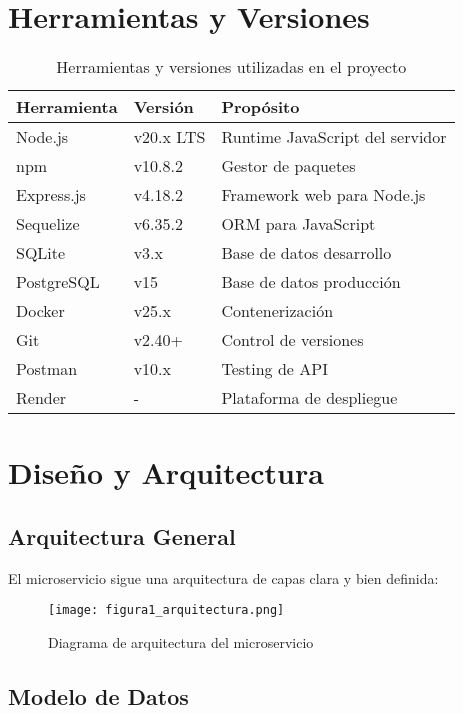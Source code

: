 \documentclass[12pt,a4paper]{article}
\begin{document}
\section{Herramientas y Versiones}

\begin{table}[H]
\centering
\caption{Herramientas y versiones utilizadas en el proyecto}
\begin{tabular}{@{}lll@{}}
\toprule
\textbf{Herramienta} & \textbf{Versión} & \textbf{Propósito} \\
\midrule
Node.js & v20.x LTS & Runtime JavaScript del servidor \\
npm & v10.8.2 & Gestor de paquetes \\
Express.js & v4.18.2 & Framework web para Node.js \\
Sequelize & v6.35.2 & ORM para JavaScript \\
SQLite & v3.x & Base de datos desarrollo \\
PostgreSQL & v15 & Base de datos producción \\
Docker & v25.x & Contenerización \\
Git & v2.40+ & Control de versiones \\
Postman & v10.x & Testing de API \\
Render & - & Plataforma de despliegue \\
\bottomrule
\end{tabular}
\end{table}

\section{Diseño y Arquitectura}

\subsection{Arquitectura General}

El microservicio sigue una arquitectura de capas clara y bien definida:

\begin{figure}[H]
\centering
\texttt{[image: figura1\_arquitectura.png]}
\caption{Diagrama de arquitectura del microservicio}
\end{figure}

\subsection{Modelo de Datos}
\end{document}
